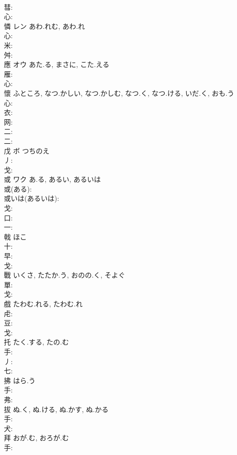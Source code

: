 \documentclass[8pt]{extreport}
\begin{document}
\begin{CJK}{UTF8}{min}
\\	彗: 
\\	心: 
\\	憐	レン	あわ.れむ, あわ.れ		
\\	心: 
\\	米: 
\\	舛: 
\\	應	オウ	あた.る, まさに, こた.える		
\\	雁: 
\\	心: 
\\	懷		ふところ, なつ.かしい, なつ.かしむ, なつ.く, なつ.ける, いだ.く, おも.う				
\\	心: 
\\	衣: 
\\	网: 
\\	二: 
\\	二: 
\\	戊	ボ	つちのえ		
\\	丿: 
\\	戈: 
\\	或	ワク	あ.る, あるい, あるいは		
\\	或(ある): 
\\	或いは(あるいは): 
\\	戈: 
\\	口: 
\\	一: 
\\	戟		ほこ				
\\	十: 
\\	早: 
\\	戈: 
\\	戰		いくさ, たたか.う, おのの.く, そよぐ				
\\	單: 
\\	戈: 
\\	戲		たわむ.れる, たわむ.れ				
\\	虍: 
\\	豆: 
\\	戈: 
\\	托		たく.する, たの.む			
\\	手: 
\\	丿: 
\\	七: 
\\	拂		はら.う				
\\	手: 
\\	弗: 
\\	拔		ぬ.く, ぬ.ける, ぬ.かす, ぬ.かる				
\\	手: 
\\	犬: 
\\	拜		おが.む, おろが.む				
\\	手: 

\end{CJK}
\end{document}
